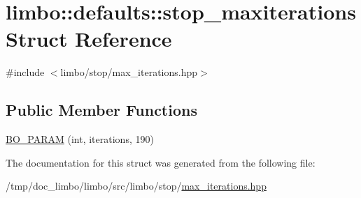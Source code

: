 \hypertarget{structlimbo_1_1defaults_1_1stop__maxiterations}{}\section{limbo\+:\+:defaults\+:\+:stop\+\_\+maxiterations Struct Reference}
\label{structlimbo_1_1defaults_1_1stop__maxiterations}


{\ttfamily \#include $<$limbo/stop/max\+\_\+iterations.\+hpp$>$}

\subsection*{Public Member Functions}
\begin{DoxyCompactItemize}
\item 
\hyperlink{group__stop__defaults_ga87b011bd30622aa8b333b0d3452412ad}{B\+O\+\_\+\+P\+A\+R\+AM} (int, iterations, 190)
\end{DoxyCompactItemize}


The documentation for this struct was generated from the following file\+:\begin{DoxyCompactItemize}
\item 
/tmp/doc\+\_\+limbo/limbo/src/limbo/stop/\hyperlink{max__iterations_8hpp}{max\+\_\+iterations.\+hpp}\end{DoxyCompactItemize}
